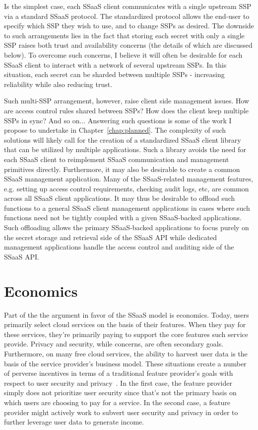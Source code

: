Is the simplest case, each SSaaS client communicates with a single
upstream SSP via a standard SSaaS protocol. The standardized protocol
allows the end-user to specify which SSP they wish to use, and to
change SSPs as desired. The downside to such arrangements lies in the
fact that storing each secret with only a single SSP raises both trust
and availability concerns (the details of which are discussed
below). To overcome such concerns, I believe it will often be
desirable for each SSaaS client to interact with a network of several
upstream SSPs. In this situation, each secret can be sharded between
multiple SSPs - increasing reliability while also reducing trust.

Such multi-SSP arrangement, however, raise client side management
issues. How are access control rules shared between SSPs? How does the
client keep multiple SSPs in sync? And so on... Answering such
questions is some of the work I propose to undertake in
Chapter~\ref{chap:planned}. The complexity of such solutions will
likely call for the creation of a standardized SSaaS client library
that can be utilized by multiple applications. Such a library avoids
the need for each SSaaS client to reimplement SSaaS communication and
management primitives directly. Furthermore, it may also be desirable
to create a common SSaaS management application. Many of the
SSaaS-related management features, e.g. setting up access control
requirements, checking audit logs, etc, are common across all SSaaS
client applications. It may thus be desirable to offload such
functions to a general SSaaS client management applications in cases
where such functions need not be tightly coupled with a given
SSaaS-backed applications. Such offloading allows the primary
SSaaS-backed applications to focus purely on the secret storage and
retrieval side of the SSaaS API while dedicated management
applications handle the access control and auditing side of the SSaaS
API.

\section{Economics}
\label{chap:ssaas:economics}

Part of the the argument in favor of the SSaaS model is
economics. Today, users primarily select cloud services on the basis
of their features. When they pay for these services, they're primarily
paying to support the core features such service provide. Privacy and
security, while concerns, are often secondary goals. Furthermore, on
many free cloud services, the ability to harvest user data is the
basis of the service provider's business model. These situations
create a number of perverse incentives in terms of a traditional
feature provider's goals with respect to user security and
privacy~\cite{anderson2001}. In the first case, the feature provider
simply does not prioritize user security since that's not the primary
basis on which users are choosing to pay for a service. In the second
case, a feature provider might actively work to subvert user security
and privacy in order to further leverage user data to generate income.

